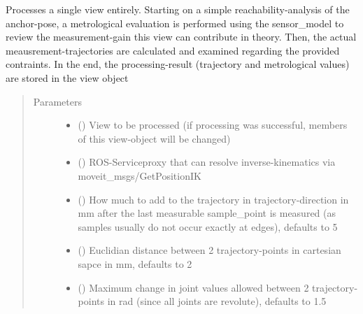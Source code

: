 \documentclass[letterpaper,10pt,english]{sphinxmanual}
\begin{document}
\begin{fulllineitems}
\begin{fulllineitems}
\label{\detokenize{module_trajectory_manager:agiprobot_measurement.trajectory_manager.TrajectoryManager.process_view}}
Processes a single view entirely. Starting on a simple reachability-analysis of the anchor-pose, a metrological evaluation is performed using the sensor\_model to
review the measurement-gain this view can contribute in theory. Then, the actual meausrement-trajectories are calculated and examined regarding the
provided contraints. In the end, the processing-result (trajectory and metrological values) are stored in the view object
\begin{quote}\begin{description}
\item[{Parameters}] \leavevmode\begin{itemize}
\item {} 
 () \textendash{} View to be processed (if processing was successful, members of this view-object will be changed)

\item {} 
 () \textendash{} ROS-Serviceproxy that can resolve inverse-kinematics via moveit\_msgs/GetPositionIK

\item {} 
 (\sphinxstyleliteralemphasis{, }) \textendash{} How much to add to the trajectory in trajectory-direction in mm after the last measurable sample\_point is measured (as samples usually do not occur exactly at edges), defaults to 5

\item {} 
 (\sphinxstyleliteralemphasis{, }) \textendash{} Euclidian distance between 2 trajectory-points in cartesian sapce in mm, defaults to 2

\item {} 
 (\sphinxstyleliteralemphasis{, }) \textendash{} Maximum change in joint values allowed between 2 trajectory-points in rad (since all joints are revolute), defaults to 1.5


\end{itemize}
\end{description}
\end{quote}
\end{fulllineitems}
\end{fulllineitems}
\end{document}
